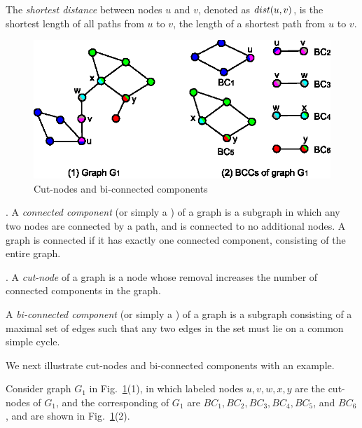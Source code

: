The {\em shortest distance} between nodes $u$ and $v$, denoted as $\dist(u, v)$, is the shortest length of all paths from $u$ to $v$, \ie
the length of a shortest path from $u$ to $v$.


\begin{figure}[tb!]
\begin{center}
\includegraphics[scale=0.9]{./cut-nodes.eps}
\end{center}
\vspace{-2ex}
\caption{Cut-nodes and bi-connected components}
  \label{fig-cut-nodes}\vspace{-2ex}
\end{figure}

.
A {\em connected component} (or simply a \cc) of a graph is a subgraph in which any two nodes are connected by a path, and is connected to no additional nodes.
A graph is connected if it has exactly one connected component, consisting of the entire graph.


.
A {\em cut-node} of a graph is a node whose removal increases the number of connected components in the graph.

A {\em bi-connected component} (or simply a \bc) of a graph is a subgraph consisting of a maximal set of edges such that any two edges in the set must lie on a common simple cycle.

We next illustrate cut-nodes and bi-connected components with an example.

\begin{example}
\label{exm-bccs} Consider graph $G_1$ in Fig.~\ref{fig-cut-nodes}(1), in which labeled nodes $u, v, w, x, y$ are the cut-nodes of $G_1$,
and the corresponding \bccs of $G_1$ are $BC_1, BC_2, BC_3, BC_4, BC_5$, and $BC_6$, and are shown in Fig.~\ref{fig-cut-nodes}(2).
\end{example}
